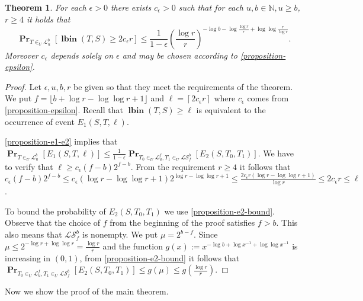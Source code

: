﻿\documentclass[review]{elsarticle}
\newcommand{\lbin}[2]{\operatorname{\mathbf{lbin}}({#1}, {#2})}
\newcommand{\linearmaps}[2]{\mathcal{L}_{#1}^{#2}}
\newcommand{\surjectivelinearmaps}[2]{\mathcal{LS}_{#1}^{#2}}
\newcommand{\probs}[2]{\operatorname{\mathbf{Pr}}_{{#1}}\left[{#2}\right]}
\newtheorem{theorem}{Theorem}
\begin{document}
\begin{theorem}
\label{theorem-prob-distribution-bound}
For each $\epsilon > 0$ there exists $c_\epsilon > 0$ such that for each $u, b \in \mathbb{N}, u \geq b$, $r \geq 	 4$ it holds that
\[
\probs{T \in_U \linearmaps{u}{b}}{\lbin{T}{S} \geq 2 c_\epsilon r} \leq \frac{1}{1 - \epsilon}\left(\frac{\log r}{r}\right)^{-\log b - \log \frac{\log r}{r} + \log \log \frac{r}{\log r}}.
\]
Moreover $c_\epsilon$ depends solely on $\epsilon$ and may be chosen according to \cref{proposition-epsilon}.
\end{theorem}
\begin{proof}
Let $\epsilon, u, b, r$ be given so that they meet the requirements of the theorem.
We put $f = \lfloor b + \log r - \log \log r + 1 \rfloor$ and $\ell = \left \lceil 2c_\epsilon r \right\rceil$ where $c_\epsilon$ comes from \cref{proposition-epsilon}.
Recall that $\lbin{T}{S} \geq \ell$ is equivalent to the occurrence of event $E_1(S, T, \ell)$.

\cref{proposition-e1-e2} implies that $\probs{T \in_U \linearmaps{u}{b}}{E_1(S, T, \ell)} \leq \frac{1}{1 - \epsilon}\probs{T_0 \in_U \linearmaps{u}{f}, T_1 \in_U \surjectivelinearmaps{f}{b}}{E_2(S, T_0, T_1)}$.
We have to verify that $\ell \geq c_\epsilon (f - b)2^{f - b}$.
From the requirement $r \geq 4$ it follows that $c_\epsilon(f - b)2^{f - b} \leq c_\epsilon(\log r - \log \log r + 1)2^{\log r - \log \log r + 1} \leq \frac{2c_\epsilon r(\log r - \log \log r + 1)}{\log r} \leq 2c_\epsilon r \leq \ell$.

To bound the probability of $E_2(S, T_0, T_1)$ we use \cref{proposition-e2-bound}.
Observe that the choice of $f$ from the beginning of the proof satisfies $f > b$.
This also means that $\surjectivelinearmaps{f}{b}$ is nonempty. 
We put $\mu = 2^{b - f}$.
Since $\mu \leq 2^{-\log r + \log \log r} = \frac{\log r}{r}$ and the function $g(x) := x ^ {- \log b + \log x^{-1} + \log \log x^{-1}}$ is increasing in $(0, 1)$, from \cref{proposition-e2-bound} it follows that $\probs{T_0 \in_U \linearmaps{u}{f}, T_1 \in_U \surjectivelinearmaps{f}{b}}{E_2(S, T_0, T_1)} \leq g(\mu) \leq g\left(\frac{\log r}{r}\right)$.
\end{proof}

Now we show the proof of the main theorem.
\end{document}
